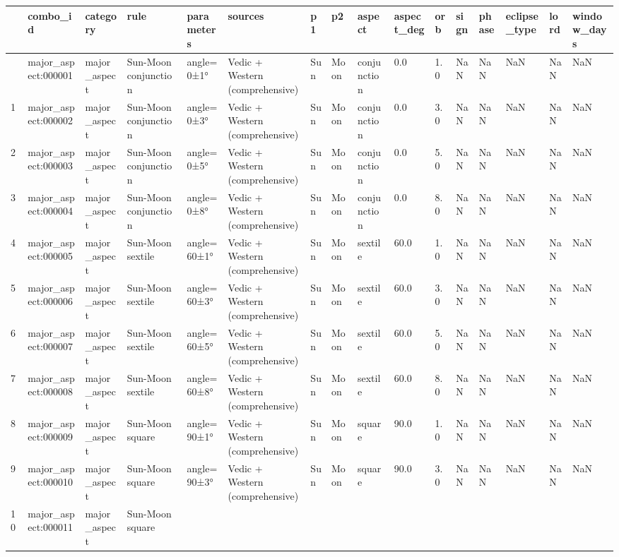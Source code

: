 \documentclass[
  11pt,
  a4paper,
  oneside,
  openany]{report}
\begin{document}
\label{gold-astro-catalog}
\begin{longtable}[]{@{}llllllllllllllll@{}}
\toprule\noalign{}
& combo\_id & category & rule & parameters & sources & p1 & p2 & aspect
& aspect\_deg & orb & sign & phase & eclipse\_type & lord &
window\_days \\
\midrule\noalign{}
\endhead
\bottomrule\noalign{}
\endlastfoot
0 & major\_aspect:000001 & major\_aspect & Sun-Moon conjunction &
angle=0±1° & Vedic + Western (comprehensive) & Sun & Moon & conjunction
& 0.0 & 1.0 & NaN & NaN & NaN & NaN & NaN \\
1 & major\_aspect:000002 & major\_aspect & Sun-Moon conjunction &
angle=0±3° & Vedic + Western (comprehensive) & Sun & Moon & conjunction
& 0.0 & 3.0 & NaN & NaN & NaN & NaN & NaN \\
2 & major\_aspect:000003 & major\_aspect & Sun-Moon conjunction &
angle=0±5° & Vedic + Western (comprehensive) & Sun & Moon & conjunction
& 0.0 & 5.0 & NaN & NaN & NaN & NaN & NaN \\
3 & major\_aspect:000004 & major\_aspect & Sun-Moon conjunction &
angle=0±8° & Vedic + Western (comprehensive) & Sun & Moon & conjunction
& 0.0 & 8.0 & NaN & NaN & NaN & NaN & NaN \\
4 & major\_aspect:000005 & major\_aspect & Sun-Moon sextile &
angle=60±1° & Vedic + Western (comprehensive) & Sun & Moon & sextile &
60.0 & 1.0 & NaN & NaN & NaN & NaN & NaN \\
5 & major\_aspect:000006 & major\_aspect & Sun-Moon sextile &
angle=60±3° & Vedic + Western (comprehensive) & Sun & Moon & sextile &
60.0 & 3.0 & NaN & NaN & NaN & NaN & NaN \\
6 & major\_aspect:000007 & major\_aspect & Sun-Moon sextile &
angle=60±5° & Vedic + Western (comprehensive) & Sun & Moon & sextile &
60.0 & 5.0 & NaN & NaN & NaN & NaN & NaN \\
7 & major\_aspect:000008 & major\_aspect & Sun-Moon sextile &
angle=60±8° & Vedic + Western (comprehensive) & Sun & Moon & sextile &
60.0 & 8.0 & NaN & NaN & NaN & NaN & NaN \\
8 & major\_aspect:000009 & major\_aspect & Sun-Moon square & angle=90±1°
& Vedic + Western (comprehensive) & Sun & Moon & square & 90.0 & 1.0 &
NaN & NaN & NaN & NaN & NaN \\
9 & major\_aspect:000010 & major\_aspect & Sun-Moon square & angle=90±3°
& Vedic + Western (comprehensive) & Sun & Moon & square & 90.0 & 3.0 &
NaN & NaN & NaN & NaN & NaN \\
10 & major\_aspect:000011 & major\_aspect & Sun-Moon square &

\end{longtable}
\end{document}
